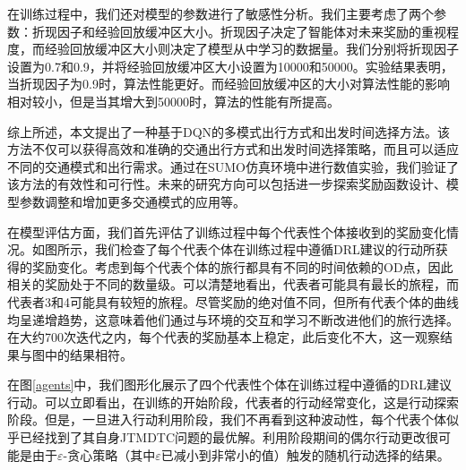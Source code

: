 在训练过程中，我们还对模型的参数进行了敏感性分析。我们主要考虑了两个参数：折现因子和经验回放缓冲区大小。折现因子决定了智能体对未来奖励的重视程度，而经验回放缓冲区大小则决定了模型从中学习的数据量。我们分别将折现因子设置为0.7和0.9，并将经验回放缓冲区大小设置为10000和50000。实验结果表明，当折现因子为0.9时，算法性能更好。而经验回放缓冲区的大小对算法性能的影响相对较小，但是当其增大到50000时，算法的性能有所提高。

综上所述，本文提出了一种基于DQN的多模式出行方式和出发时间选择方法。该方法不仅可以获得高效和准确的交通出行方式和出发时间选择策略，而且可以适应不同的交通模式和出行需求。通过在SUMO仿真环境中进行数值实验，我们验证了该方法的有效性和可行性。未来的研究方向可以包括进一步探索奖励函数设计、模型参数调整和增加更多交通模式的应用等。

在模型评估方面，我们首先评估了训练过程中每个代表性个体接收到的奖励变化情况。如图所示，我们检查了每个代表个体在训练过程中遵循DRL建议的行动所获得的奖励变化。考虑到每个代表个体的旅行都具有不同的时间依赖的OD点，因此相关的奖励处于不同的数量级。可以清楚地看出，代表者可能具有最长的旅程，而代表者3和4可能具有较短的旅程。尽管奖励的绝对值不同，但所有代表个体的曲线均呈递增趋势，这意味着他们通过与环境的交互和学习不断改进他们的旅行选择。在大约700次迭代之内，每个代表的奖励基本上稳定，此后变化不大，这一观察结果与图中的结果相符。

在图\ref{agents}中，我们图形化展示了四个代表性个体在训练过程中遵循的DRL建议行动。可以立即看出，在训练的开始阶段，代表者的行动经常变化，这是行动探索阶段。但是，一旦进入行动利用阶段，我们不再看到这种波动性，每个代表个体似乎已经找到了其自身JTMDTC问题的最优解。利用阶段期间的偶尔行动更改很可能是由于$\varepsilon$-贪心策略（其中$\varepsilon$已减小到非常小的值）触发的随机行动选择的结果。


